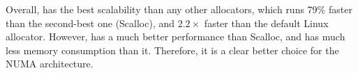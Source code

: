 Overall, \NM{} has the best scalability than any other allocators, which runs 79\% faster than the second-best one (Scalloc), and $2.2\times$ faster than the default Linux allocator. However, \NM{} has a much better performance than Scalloc, and has much less memory consumption than it. Therefore, it is a clear better choice for the NUMA architecture. 

